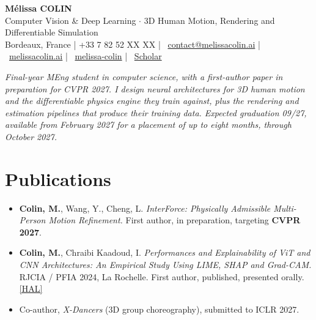 \documentclass[10pt, letterpaper]{article}
\providecommand{\myphone}{+33 7 82 52 XX XX}
\begin{document}
\begin{center}
    {\fontsize{19}{19}\selectfont \textbf{Mélissa COLIN}} \\[3pt]
    {\normalsize Computer Vision \& Deep Learning $\cdot$ 3D Human Motion, Rendering and Differentiable Simulation} \\[3pt]

    \small{
    \faMapMarker* Bordeaux, France \;|\;
    \faPhone* \myphone{} \;|\;
    \faEnvelope~\href{mailto:contact@melissacolin.ai}{contact@melissacolin.ai} \;|\;
    \faGlobe~\href{https://melissacolin.ai}{melissacolin.ai} \;|\;
    \faGithub~\href{https://github.com/melissa-colin}{melissa-colin} \;|\;
    \faGraduationCap~\href{https://scholar.google.com/citations?user=7r7iFpsAAAAJ}{Scholar}
    }
\end{center}

\vspace{1pt}

{\small \textit{Final-year MEng student in computer science, with a first-author paper in preparation for CVPR 2027. I design neural architectures for 3D human motion and the differentiable
physics engine they train against, plus the rendering and estimation pipelines that produce
their training data. Expected graduation 09/27, available from February 2027 for a placement
of up to eight months, through October 2027.}}

\section{Publications}
\begin{itemize}
    \item \textbf{Colin, M.}, Wang, Y., Cheng, L. \textit{InterForce: Physically Admissible Multi-Person Motion Refinement.} First author, in preparation, targeting \textbf{CVPR 2027}.
    \item \textbf{Colin, M.}, Chraibi Kaadoud, I. \textit{Performances and Explainability of ViT and CNN Architectures: An Empirical Study Using LIME, SHAP and Grad-CAM.} RJCIA / PFIA 2024, La Rochelle. First author, published, presented orally. \href{https://hal.science/hal-04641791}{[HAL]}
    \item Co-author, \textit{X-Dancers} (3D group choreography), submitted to ICLR 2027.
\end{itemize}
\end{document}
